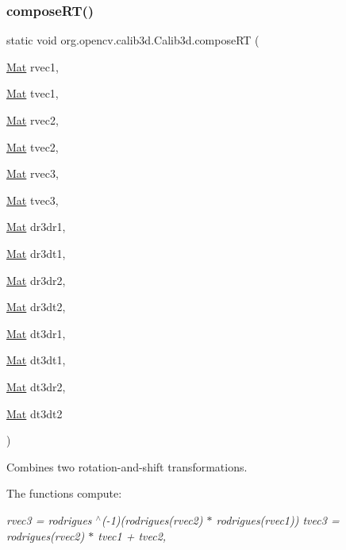 \subsubsection{\texorpdfstring{compose\+R\+T()}{composeRT()}\hspace{0.1cm}{\footnotesize\ttfamily [1/2]}}
{\footnotesize\ttfamily static void org.\+opencv.\+calib3d.\+Calib3d.\+compose\+RT (\begin{DoxyParamCaption}\item[{\mbox{\hyperlink{classorg_1_1opencv_1_1core_1_1_mat}{Mat}}}]{rvec1,  }\item[{\mbox{\hyperlink{classorg_1_1opencv_1_1core_1_1_mat}{Mat}}}]{tvec1,  }\item[{\mbox{\hyperlink{classorg_1_1opencv_1_1core_1_1_mat}{Mat}}}]{rvec2,  }\item[{\mbox{\hyperlink{classorg_1_1opencv_1_1core_1_1_mat}{Mat}}}]{tvec2,  }\item[{\mbox{\hyperlink{classorg_1_1opencv_1_1core_1_1_mat}{Mat}}}]{rvec3,  }\item[{\mbox{\hyperlink{classorg_1_1opencv_1_1core_1_1_mat}{Mat}}}]{tvec3,  }\item[{\mbox{\hyperlink{classorg_1_1opencv_1_1core_1_1_mat}{Mat}}}]{dr3dr1,  }\item[{\mbox{\hyperlink{classorg_1_1opencv_1_1core_1_1_mat}{Mat}}}]{dr3dt1,  }\item[{\mbox{\hyperlink{classorg_1_1opencv_1_1core_1_1_mat}{Mat}}}]{dr3dr2,  }\item[{\mbox{\hyperlink{classorg_1_1opencv_1_1core_1_1_mat}{Mat}}}]{dr3dt2,  }\item[{\mbox{\hyperlink{classorg_1_1opencv_1_1core_1_1_mat}{Mat}}}]{dt3dr1,  }\item[{\mbox{\hyperlink{classorg_1_1opencv_1_1core_1_1_mat}{Mat}}}]{dt3dt1,  }\item[{\mbox{\hyperlink{classorg_1_1opencv_1_1core_1_1_mat}{Mat}}}]{dt3dr2,  }\item[{\mbox{\hyperlink{classorg_1_1opencv_1_1core_1_1_mat}{Mat}}}]{dt3dt2 }\end{DoxyParamCaption})\hspace{0.3cm}{\ttfamily [static]}}

Combines two rotation-\/and-\/shift transformations.

The functions compute\+:

{\itshape rvec3 = rodrigues $^\wedge$(-\/1)(rodrigues(rvec2) $\ast$ rodrigues(rvec1)) tvec3 = rodrigues(rvec2) $\ast$ tvec1 + tvec2,}


